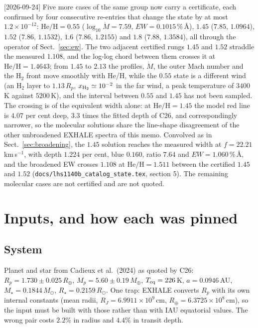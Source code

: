 \documentclass[english,a4paper]{my_memo}
\begin{document}
[2026-09-24] Five more cases of the same group now carry a certificate, each
confirmed by four consecutive re-entries that change the state by at most
$1.2\times10^{-12}$: $\mathrm{He/H} = 0.55$ ($\log_{10}\dot M = 7.59$,
$EW = 0.1015$\,\%\,\AA), $1.45$ ($7.85$, $1.0964$), $1.52$ ($7.86$,
$1.1532$), $1.6$ ($7.86$, $1.2155$) and $1.8$ ($7.88$, $1.3584$), all through
the operator of Sect.~\ref{sec:ew}. The two adjacent certified rungs
$1.45$ and $1.52$ straddle the measured $1.108$, and the log-log chord
between them crosses it at $\mathrm{He/H} = 1.4643$; from $1.45$ to $2.13$
the profiles, $\dot M$, the outer Mach number and the H$_2$ front move
smoothly with He/H, while the $0.55$ state is a different wind (an H$_2$
layer to $1.13\,R_p$, $x_{\rm H_2} \simeq 10^{-2}$ in the far wind, a peak
temperature of $3400$\,K against $5200$\,K), and the interval between $0.55$
and $1.45$ has not been sampled. The crossing is of the equivalent width
alone: at $\mathrm{He/H} = 1.45$ the model red line is $4.07$ per cent deep,
$3.3$ times the fitted depth of C26, and correspondingly narrower, so the
molecular solutions share the line-shape disagreement of the other
unbroadened EXHALE spectra of this memo. Convolved as in
Sect.~\ref{sec:broadening}, the $1.45$ solution reaches the measured width at
$f = 22.21$\,km\,s$^{-1}$, with depth $1.224$ per cent, blue $0.160$, ratio
$7.64$ and $EW = 1.060$\,\%\,\AA, and the broadened EW crosses $1.108$ at
$\mathrm{He/H} = 1.511$ between the certified $1.45$ and $1.52$
(\texttt{docs/lhs1140b\_catalog\_state.tex}, section 5). The remaining
molecular cases are not certified and are not quoted.

\section{Inputs, and how each was pinned}
\label{sec:inputs}

\subsection{System}
Planet and star from Cadieux et al.\ (2024) as quoted by C26:
$R_p = 1.730 \pm 0.025\,R_\oplus$, $M_p = 5.60 \pm 0.19\,M_\oplus$,
$T_{\rm eq} = 226$\,K, $a = 0.0946$\,AU, $M_\star = 0.1844\,M_\odot$,
$R_\star = 0.2159\,R_\odot$. One trap: EXHALE converts $R_p$ with its own
internal constants (mean radii, $R_J = 6.9911\times10^{9}$\,cm,
$R_\oplus = 6.3725\times10^{8}$\,cm), so the input must be built with those
rather than with IAU equatorial values. The wrong pair costs $2.2\%$ in
radius and $4.4\%$ in transit depth.
\end{document}
